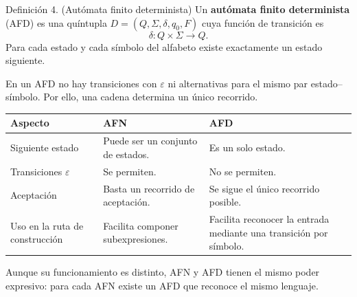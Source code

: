 \documentclass[11pt,spanish]{article}
\providecommand{\tabularnewline}{\\}
\begin{document}
\begin{definicion}{Definición 4. (Autómata finito determinista)}
Un \textbf{autómata finito determinista} (AFD) es una quíntupla \(D=(Q,\Sigma,\delta,q_0,F)\) cuya función de transición es
\[
\delta:Q\times\Sigma\longrightarrow Q.
\]
Para cada estado y cada símbolo del alfabeto existe exactamente un estado siguiente.
\end{definicion}

En un AFD no hay transiciones con \(\varepsilon\) ni alternativas para el mismo par estado--símbolo. Por ello, una cadena determina un único recorrido.

\begin{center}
\renewcommand{\arraystretch}{1.25}
\begin{tabular}{|p{}|p{}|p{}|}
\hline
\textbf{Aspecto} & \textbf{AFN} & \textbf{AFD} \tabularnewline
\hline
Siguiente estado & Puede ser un conjunto de estados. & Es un solo estado. \tabularnewline
\hline
Transiciones \(\varepsilon\) & Se permiten. & No se permiten. \tabularnewline
\hline
Aceptación & Basta un recorrido de aceptación. & Se sigue el único recorrido posible. \tabularnewline
\hline
Uso en la ruta de construcción & Facilita componer subexpresiones. & Facilita reconocer la entrada mediante una transición por símbolo. \tabularnewline
\hline
\end{tabular}
\end{center}

Aunque su funcionamiento es distinto, AFN y AFD tienen el mismo poder expresivo: para cada AFN existe un AFD que reconoce el mismo lenguaje.
\end{document}
